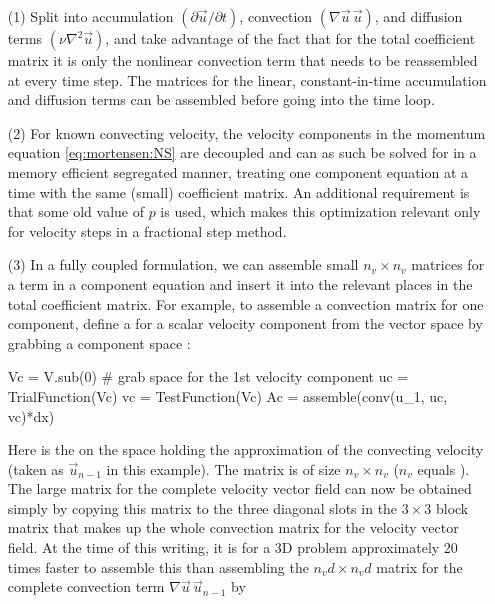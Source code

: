 \begin{itemize}
 \item[(1)] Split  into accumulation $(\partial \vec{u}/\partial t)$,
   convection $(\nabla \vec{u} \, \vec{u})$, and diffusion terms
   $(\nu\nabla^2 \vec{u})$, and take advantage of the fact that for the total
   coefficient matrix it is only the nonlinear convection term that
   needs to be reassembled at every time step. The matrices for the
   linear, constant-in-time accumulation and diffusion terms can be
   assembled before going into the time loop.

\item[(2)] For known convecting velocity, the velocity components in
  the momentum equation \eqref{eq:mortensen:NS} are decoupled and
  can as such be solved for in a memory efficient segregated manner,
  treating one component equation at a time with the same (small)
  coefficient matrix. An additional requirement is that some old value
  of $p$ is used, which makes this optimization relevant only for
  velocity steps in a fractional step method.

\item[(3)] In a fully coupled formulation, we can assemble small
  $n_v\times n_v$ matrices for a term in a component equation and
  insert it into the relevant places in the total coefficient matrix.
  For example, to assemble a convection matrix for one component,
  define a  for a scalar velocity component from
  the vector space  by grabbing a component space :
\begin{python}
Vc = V.sub(0)  # grab space for the 1st velocity component
uc = TrialFunction(Vc)
vc = TestFunction(Vc)
Ac = assemble(conv(u_1, uc, vc)*dx)
\end{python}
Here  is the  on the space  holding the
approximation of the convecting velocity (taken as $\vec{u}_{n-1}$ in
this example).  The matrix  is of size $n_v\times n_v$ ($n_v$
equals ).  The large matrix for the complete velocity
vector field can now be obtained simply by copying this 
matrix to the three diagonal slots in the $3\times 3$ block matrix
that makes up the whole convection matrix for the velocity vector
field.  At the time of this writing, it is for a 3D problem
approximately 20 times faster to assemble this  than
assembling the $n_vd\times n_vd$ matrix for the complete convection
term $\nabla \vec{u} \, \vec{u}_{n-1}$ by 


\end{itemize}
